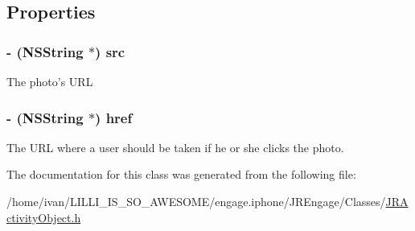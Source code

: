 \subsection{Properties}
\hypertarget{interface_j_r_image_media_object_aad75823f9189dfca758bc4d4712c3621}{
\subsubsection[{src}]{\setlength{\rightskip}{0pt plus 5cm}-\/ (NSString $\ast$) src}}
\label{interface_j_r_image_media_object_aad75823f9189dfca758bc4d4712c3621}
The photo's URL \hypertarget{interface_j_r_image_media_object_a95642c3f4bc97a112a3ab32beef46f66}{
\subsubsection[{href}]{\setlength{\rightskip}{0pt plus 5cm}-\/ (NSString $\ast$) href}}
\label{interface_j_r_image_media_object_a95642c3f4bc97a112a3ab32beef46f66}
The URL where a user should be taken if he or she clicks the photo. 

The documentation for this class was generated from the following file:\begin{DoxyCompactItemize}
\item 
/home/ivan/LILLI\_\-IS\_\-SO\_\-AWESOME/engage.iphone/JREngage/Classes/\hyperlink{_j_r_activity_object_8h}{JRActivityObject.h}\end{DoxyCompactItemize}
